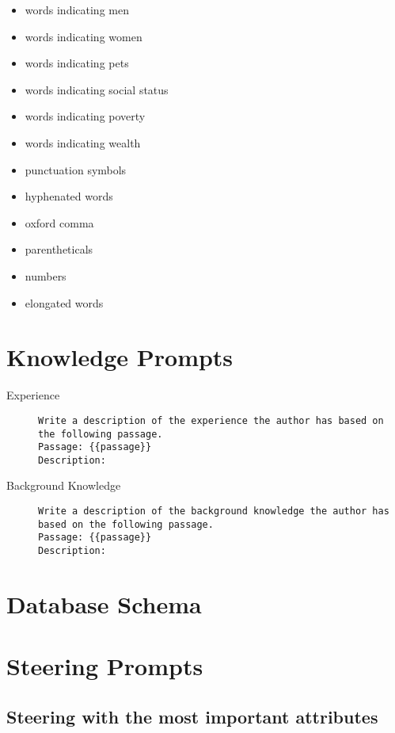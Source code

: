 \begin{multicols}{2}
\begin{itemize}[nolistsep]
    \item words indicating men
    \item words indicating women
    \item words indicating pets
    \item words indicating social status
    \item words indicating poverty
    \item words indicating wealth
    \item punctuation symbols
    \item hyphenated words
    \item oxford comma
    \item parentheticals
    \item numbers
    \item elongated words
  \end{itemize}
\end{multicols}

\section{Knowledge Prompts}
\label{sec:appendix:knowledgePrompts}
\begin{description}
  \item[Experience]\leavevmode \newline
        \begin{minipage}{\linewidth}
          \begin{lstlisting}
Write a description of the experience the author has based on the following passage.
Passage: {{passage}}
Description:
\end{lstlisting}
        \end{minipage}
  \item[Background Knowledge]\leavevmode \newline
        \begin{minipage}{\linewidth}
          \begin{lstlisting}
Write a description of the background knowledge the author has based on the following passage.
Passage: {{passage}}
Description:
\end{lstlisting}
        \end{minipage}
\end{description}

\section{Database Schema}
\label{sec:appendix:databaseSchema}

\section{Steering Prompts}
\label{sec:appendix:steeringPrompts}

\subsection{Steering with the most important attributes}
\label{sec:appendix:steeringPrompts:attribute}
